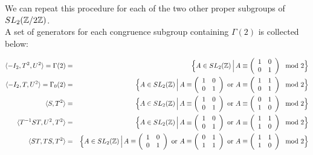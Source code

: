 \begin{example}
We can repeat this procedure for each of the two other proper subgroups of $\sltznz[2]$. \\
A set of generators for each congruence subgroup containing $\Gamma(2)$ is collected below:

\begin{eqnarray*}
 \langle -I_2, T^2, U^2 \rangle = \Gamma(2) & = & \Big  \lbrace  A \in \sltz  \, \Big \vert \, A \equiv \left(\begin{array}{ c c } 1 & 0 \\ 0 & 1 \end{array} \right) \mod 2 \Big  \rbrace 
\\
 \langle -I_2, T, U^2 \rangle = \Gamma_0(2) & = & \Big  \lbrace  A \in \sltz  \, \Big \vert \, A \equiv \left(\begin{array}{ c c } 1 & 0 \\ 0 & 1 \end{array} \right) \text{ or } A \equiv \left(\begin{array}{ c c } 1 & 1 \\ 0 & 1 \end{array} \right) \mod 2 \Big  \rbrace 
\\
\langle S, T^2 \rangle & = & \Big  \lbrace  A \in \sltz  \, \Big \vert \, A \equiv \left(\begin{array}{ c c } 1 & 0 \\ 0 & 1 \end{array} \right) \text{ or } A \equiv \left(\begin{array}{ c c } 0 & 1 \\ 1 & 0 \end{array} \right) \mod 2 \Big  \rbrace
\\
\langle T^{-1}ST, U^2, T^2 \rangle & = & \Big  \lbrace  A \in \sltz  \, \Big \vert \, A \equiv \left(\begin{array}{ c c } 1 & 0 \\ 0 & 1 \end{array} \right) \text{ or } A \equiv \left(\begin{array}{ c c } 1 & 1 \\ 1 & 0 \end{array} \right) \mod 2 \Big  \rbrace
\\
\langle ST, TS, T^2 \rangle &=&  \Big  \lbrace  A \in \sltz  \, \Big \vert \, A \equiv \left(\begin{array}{ c c } 1 & 0 \\ 0 & 1 \end{array} \right) \text{ or } A \equiv \left(\begin{array}{ c c } 0 & 1 \\ 1 & 1 \end{array} \right) \text{ or } A \equiv \left(\begin{array}{ c c } 1 & 1 \\ 1 & 0 \end{array} \right)  \mod 2 \Big  \rbrace 
\end{eqnarray*}
\end{example}

